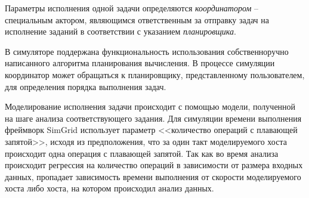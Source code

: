 \documentclass[../diploma.tex]{subfile}
\begin{document}
    Параметры исполнения одной задачи определяются {\it координатором} --
    специальным актором, являющимся ответственным за отправку задач на
    исполнение заданий в соответствии с указанием {\it планировщика}. 

    В симуляторе поддержана функциональность использования собственноручно
    написанного алгоритма планирования вычисления. В процессе симуляции
    координатор может обращаться к планировщику, представленному пользователем,
    для определения порядка выполнения задач. 

    Моделирование исполнения задачи происходит с помощью модели, полученной на
    шаге анализа соответствующего задания. Для симуляции времени выполнения
    фреймворк SimGrid использует параметр <<количество операций с плавающей
    запятой>>, исходя из предположения, что за один такт моделируемого хоста
    происходит одна операция с плавающей запятой. Так как во время анализа
    происходит регрессия на количество операций в зависимости от размера входных
    данных, пропадает зависимость времени выполнения от скорости моделируемого
    хоста либо хоста, на котором происходил анализ данных.
\end{document}
